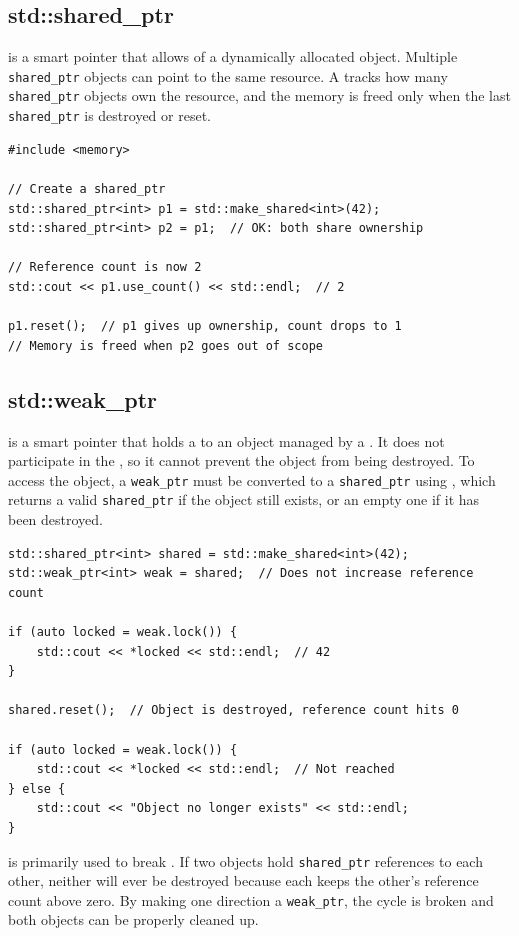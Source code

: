 \subsection{std::shared\_ptr}
 is a smart pointer that allows  of a dynamically allocated object. Multiple \texttt{shared\_ptr} objects can point to the same resource. A  tracks how many \texttt{shared\_ptr} objects own the resource, and the memory is freed only when the last \texttt{shared\_ptr} is destroyed or reset.
\begin{lstlisting}
#include <memory>

// Create a shared_ptr
std::shared_ptr<int> p1 = std::make_shared<int>(42);
std::shared_ptr<int> p2 = p1;  // OK: both share ownership

// Reference count is now 2
std::cout << p1.use_count() << std::endl;  // 2

p1.reset();  // p1 gives up ownership, count drops to 1
// Memory is freed when p2 goes out of scope
\end{lstlisting}

\subsection{std::weak\_ptr}
 is a smart pointer that holds a  to an object managed by a . It does not participate in the , so it cannot prevent the object from being destroyed. To access the object, a \texttt{weak\_ptr} must be converted to a \texttt{shared\_ptr} using , which returns a valid \texttt{shared\_ptr} if the object still exists, or an empty one if it has been destroyed.
\begin{lstlisting}
std::shared_ptr<int> shared = std::make_shared<int>(42);
std::weak_ptr<int> weak = shared;  // Does not increase reference count

if (auto locked = weak.lock()) {
    std::cout << *locked << std::endl;  // 42
}

shared.reset();  // Object is destroyed, reference count hits 0

if (auto locked = weak.lock()) {
    std::cout << *locked << std::endl;  // Not reached
} else {
    std::cout << "Object no longer exists" << std::endl;
}
\end{lstlisting}
 is primarily used to break . If two objects hold \texttt{shared\_ptr} references to each other, neither will ever be destroyed because each keeps the other's reference count above zero. By making one direction a \texttt{weak\_ptr}, the cycle is broken and both objects can be properly cleaned up.

